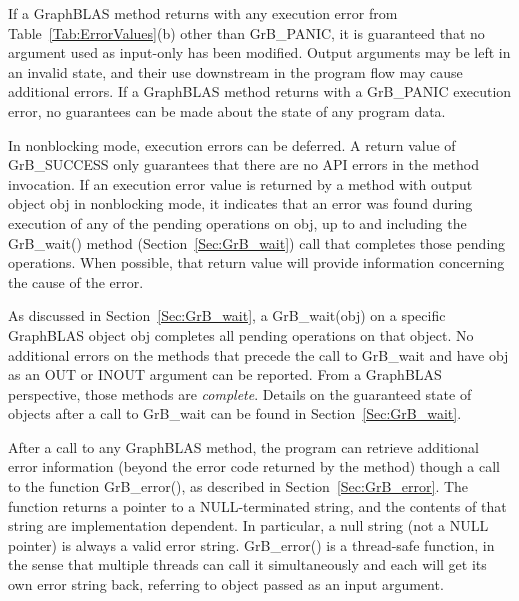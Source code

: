 If a GraphBLAS method returns with any execution error from
Table~\ref{Tab:ErrorValues}(b) other than {\sf GrB\_PANIC}, it is
guaranteed that no argument used as input-only has been modified.
Output arguments may be left in an invalid state, and their use downstream
in the program flow may cause additional errors.  If a GraphBLAS method
returns with a {\sf GrB\_PANIC} execution error, no guarantees can be
made about the state of any program data.

In nonblocking mode, execution errors can be deferred.  A return value
of {\sf GrB\_SUCCESS} only guarantees that there are no API errors
in the method invocation.  If an execution error value is returned
by a method with output object {\sf obj} in nonblocking mode, it
indicates that an error was found during execution of any of the pending
operations on {\sf obj}, up to and including the {\sf GrB\_wait()} method
(Section~\ref{Sec:GrB_wait}) call that completes those pending operations.
When possible, that return value will provide information concerning
the cause of the error.

As discussed in Section~\ref{Sec:GrB_wait}, a {\sf GrB\_wait(obj)} on a
specific GraphBLAS object {\sf obj} completes all pending operations on
that object.  No additional errors on the methods that precede the call
to {\sf GrB\_wait} and have {\sf obj} as an {\sf OUT} or {\sf INOUT}
argument can be reported.  From a GraphBLAS perspective, those methods
are {\em complete}.  Details on the guaranteed state of objects after
a call to {\sf GrB\_wait} can be found in Section~\ref{Sec:GrB_wait}.


After a call to any GraphBLAS method, the program can retrieve
additional error information (beyond the error code returned by
the method) though a call to the function {\sf GrB\_error()},
as described in Section~\ref{Sec:GrB_error}.  The function returns a
pointer to a NULL-terminated string, and the contents of that string
are implementation dependent. In particular, a null string (not a {\sf
NULL} pointer) is always a valid error string.  {\sf GrB\_error()} is
a thread-safe function, in the sense that multiple threads can call it
simultaneously and each will get its own error string back, referring
to object passed as an input argument.
